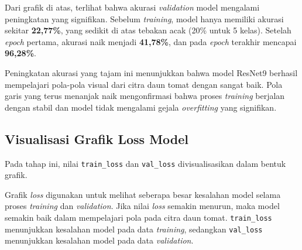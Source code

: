 Dari grafik di atas, terlihat bahwa akurasi \textit{validation} model mengalami peningkatan yang signifikan. Sebelum \textit{training}, model hanya memiliki akurasi sekitar \textbf{22,77\%}, yang sedikit di atas tebakan acak (20\% untuk 5 kelas). Setelah \textit{epoch} pertama, akurasi naik menjadi \textbf{41,78\%}, dan pada \textit{epoch} terakhir mencapai \textbf{96,28\%}.

Peningkatan akurasi yang tajam ini menunjukkan bahwa model ResNet9 berhasil mempelajari pola-pola visual dari citra daun tomat dengan sangat baik. Pola garis yang terus menanjak naik mengonfirmasi bahwa proses \textit{training} berjalan dengan stabil dan model tidak mengalami gejala \textit{overfitting} yang signifikan.

\subsection{Visualisasi Grafik Loss Model}

Pada tahap ini, nilai \texttt{train\_loss} dan \texttt{val\_loss} divisualisasikan dalam bentuk grafik.

Grafik \textit{loss} digunakan untuk melihat seberapa besar kesalahan model selama proses \textit{training} dan \textit{validation}. Jika nilai \textit{loss} semakin menurun, maka model semakin baik dalam mempelajari pola pada citra daun tomat. \texttt{train\_loss} menunjukkan kesalahan model pada data \textit{training}, sedangkan \texttt{val\_loss} menunjukkan kesalahan model pada data \textit{validation}.

